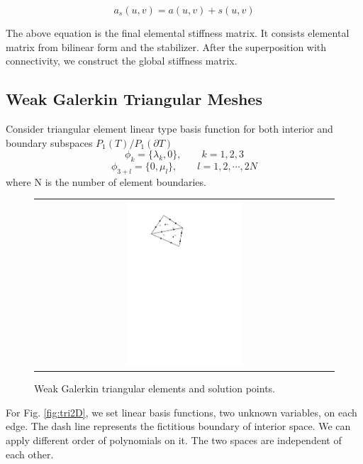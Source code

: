 \begin{equation}
a_{s} (u, v) = a(u, v) + s(u, v)
\end{equation}

The above equation is the final elemental stiffness matrix. It consists elemental matrix from bilinear form and the stabilizer. After the superposition with connectivity, we construct the global stiffness matrix.

\subsection{Weak Galerkin Triangular Meshes}

Consider triangular element linear type basis function for both interior and boundary subspaces $ P_{1}(T) / P_{1} (\partial T) $
\begin{equation}
\phi_{k} = \{ \lambda_{k}, 0 \}, \qquad k = 1,2, 3
\end{equation}
\begin{equation}
\phi_{3 + l} = \{ 0, \mu_{l} \}, \qquad l = 1, 2, \cdots , 2N
\end{equation}
where N is the number of element boundaries.

\begin{figure}[H] \label{fig:tri2D}
	\centering
	\begin{tabular}{c}
		\includegraphics[width=0.4\textwidth]{./pics/triangle.pdf}
	\end{tabular}
	\caption{\footnotesize Weak Galerkin triangular elements and solution points.}\label{fig1: triangle}
\end{figure}

For Fig. \ref{fig:tri2D}, we set linear basis functions, two unknown variables, on each edge. The dash line represents the fictitious boundary of interior space. We can apply different order of polynomials on it. The two spaces are independent of each other.  

